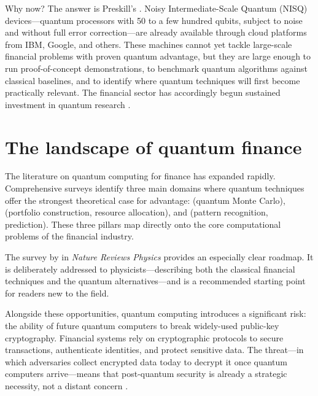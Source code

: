 Why now? The answer is Preskill's  \citep{preskill_quantum_2018}. Noisy Intermediate-Scale Quantum (NISQ) devices---quantum processors with 50 to a few hundred qubits, subject to noise and without full error correction---are already available through cloud platforms from IBM, Google, and others. These machines cannot yet tackle large-scale financial problems with proven quantum advantage, but they are large enough to run proof-of-concept demonstrations, to benchmark quantum algorithms against classical baselines, and to identify where quantum techniques will first become practically relevant. The financial sector has accordingly begun sustained investment in quantum research \citep{auer_quantum_2024,soller_quantum_nodate,soller_quantum_nodate-1}.

\section{The landscape of quantum finance}

The literature on quantum computing for finance has expanded rapidly. Comprehensive surveys \citep{herman_survey_2022,herman_quantum_2023,orus_quantum_2019,egger_quantum_2020,bunescu_modern_2024,gong_quantum_2026-1,zhou_quantum_2026} identify three main domains where quantum techniques offer the strongest theoretical case for advantage:  (quantum Monte Carlo),  (portfolio construction, resource allocation), and  (pattern recognition, prediction). These three pillars map directly onto the core computational problems of the financial industry.

\begin{remark}
The survey by \citet{herman_quantum_2023} in \emph{Nature Reviews Physics} provides an especially clear roadmap. It is deliberately addressed to physicists---describing both the classical financial techniques and the quantum alternatives---and is a recommended starting point for readers new to the field.
\end{remark}

Alongside these opportunities, quantum computing introduces a significant risk: the ability of future quantum computers to break widely-used public-key cryptography. Financial systems rely on cryptographic protocols to secure transactions, authenticate identities, and protect sensitive data. The  threat---in which adversaries collect encrypted data today to decrypt it once quantum computers arrive---means that post-quantum security is already a strategic necessity, not a distant concern \citep{auer_quantum_2024,gong_quantum_2026-1}.

